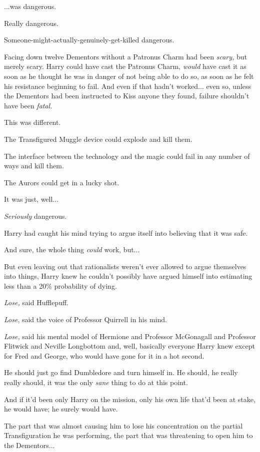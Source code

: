 ...was dangerous.

Really dangerous.

Someone-might-actually-genuinely-get-killed dangerous.

Facing down twelve Dementors without a Patronus Charm had been
\emph{scary,} but merely scary. Harry could have cast the Patronus
Charm, \emph{would} have cast it as soon as he thought he was in danger
of not being able to do so, as soon as he felt his resistance beginning
to fail. And even if that hadn't worked... even so, unless the
Dementors had been instructed to Kiss anyone they found, failure
shouldn't have been \emph{fatal.}

This was different.

The Transfigured Muggle device could explode and kill them.

The interface between the technology and the magic could fail in any
number of ways and kill them.

The Aurors could get in a lucky shot.

It was just, well...

\emph{Seriously} dangerous.

Harry had caught his mind trying to argue itself into believing that it
was safe.

And sure, the whole thing \emph{could} work, but...

But even leaving out that rationalists weren't ever allowed to argue
themselves into things, Harry knew he couldn't possibly have argued
himself into estimating less than a 20\% probability of dying.

\emph{Lose,} said Hufflepuff.

\emph{Lose}, said the voice of Professor Quirrell in his mind.

\emph{Lose,} said his mental model of Hermione and Professor McGonagall
and Professor Flitwick and Neville Longbottom and, well, basically
everyone Harry knew except for Fred and George, who would have gone for
it in a hot second.

He should just go find Dumbledore and turn himself in. He should, he
really really should, it was the only \emph{sane} thing to do at this
point.

And if it'd been only Harry on the mission, only his own life that'd
been at stake, he would have; he surely would have.

The part that was almost causing him to lose his concentration on the
partial Transfiguration he was performing, the part that was threatening
to open him to the Dementors...

